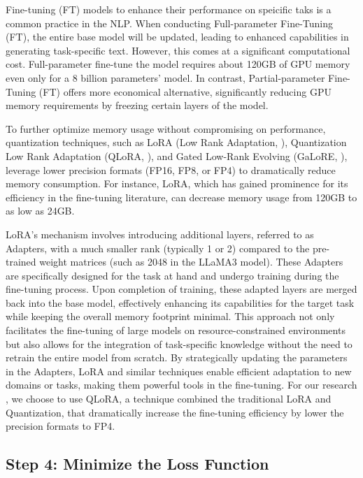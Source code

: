 Fine-tuning (FT) models to enhance their performance on speicific taks is a common practice in the NLP. When conducting Full-parameter Fine-Tuning (FT), the entire base model will be updated, leading to enhanced capabilities in generating task-specific text. However, this comes at a significant computational cost.  Full-parameter fine-tune the model requires about 120GB of GPU memory even only for a 8 billion parameters' model. In contrast, Partial-parameter Fine-Tuning (FT) offers more economical alternative, significantly reducing GPU memory requirements by freezing certain layers of the model.


To further optimize memory usage without compromising on performance, quantization techniques, such as LoRA (Low Rank Adaptation, \cite{hu2021lora}), Quantization Low Rank Adaptation (QLoRA, \cite{dettmers2024qlora}), and Gated Low-Rank Evolving (GaLoRE, \cite{zhao2024galore}), leverage lower precision formats (FP16, FP8, or FP4) to dramatically reduce memory consumption. For instance, LoRA, which has gained prominence for its efficiency in the fine-tuning literature, can decrease memory usage from 120GB to as low as 24GB.

LoRA's mechanism involves introducing additional layers, referred to as Adapters, with a much smaller rank (typically 1 or 2) compared to the pre-trained weight matrices (such as 2048 in the LLaMA3 model). These Adapters are specifically designed for the task at hand and undergo training during the fine-tuning process. Upon completion of training, these adapted layers are merged back into the base model, effectively enhancing its capabilities for the target task while keeping the overall memory footprint minimal. This approach not only facilitates the fine-tuning of large models on resource-constrained environments but also allows for the integration of task-specific knowledge without the need to retrain the entire model from scratch. By strategically updating the parameters in the Adapters, LoRA and similar techniques enable efficient adaptation to new domains or tasks, making them powerful tools in the fine-tuning. For our research , we choose to use QLoRA, a technique combined the traditional LoRA and Quantization, that dramatically increase the fine-tuning efficiency by lower the precision formats to FP4. 



\subsection{Step 4: Minimize the Loss Function}

